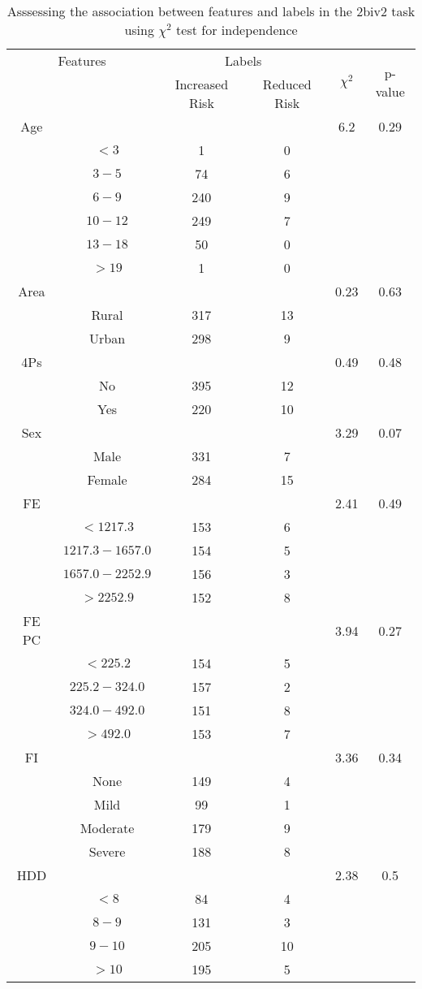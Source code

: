 \begin{table}[!htb]
\centering
\caption{Asssessing the association between features and labels in the 2biv2 task using $\chi^2$ test for independence}
\label{tab:chitest_2biv2}
\begin{tabular}{c c | c c| c | c}
\hline
\multicolumn{2}{c|}{Features}& \multicolumn{2}{c|}{Labels}& \multirow{2}{*}{$\chi^2$} & \multirow{2}{*}{p-value}\\ 
& & Increased Risk & Reduced Risk & & \\ 
\hline
Age &  &  & & 6.2 & 0.29 \\ 
& $< 3$ & 1 & 0& & \\ 
& $3-5$ & 74 & 6& & \\ 
& $6-9$ & 240 & 9& & \\ 
& $10-12$ & 249 & 7& & \\ 
& $13-18$ & 50 & 0& & \\ 
& $> 19$ & 1 & 0& & \\ 
\hline 
Area &  &  & & 0.23 & 0.63 \\ 
& Rural & 317 & 13& & \\ 
& Urban & 298 & 9& & \\ 
\hline 
4Ps &  &  & & 0.49 & 0.48 \\ 
& No & 395 & 12& & \\ 
& Yes & 220 & 10& & \\ 
\hline 
Sex &  &  & & 3.29 & 0.07 \\ 
& Male & 331 & 7& & \\ 
& Female & 284 & 15& & \\ 
\hline 
FE &  &  & & 2.41 & 0.49 \\ 
& $< 1217.3$ & 153 & 6& & \\ 
& $1217.3-1657.0$ & 154 & 5& & \\ 
& $1657.0-2252.9$ & 156 & 3& & \\ 
& $> 2252.9$ & 152 & 8& & \\ 
\hline 
FE PC &  &  & & 3.94 & 0.27 \\ 
& $< 225.2$ & 154 & 5& & \\ 
& $225.2-324.0$ & 157 & 2& & \\ 
& $324.0-492.0$ & 151 & 8& & \\ 
& $> 492.0$ & 153 & 7& & \\ 
\hline 
FI &  &  & & 3.36 & 0.34 \\ 
& None & 149 & 4& & \\ 
& Mild & 99 & 1& & \\ 
& Moderate & 179 & 9& & \\ 
& Severe & 188 & 8& & \\ 
\hline 
HDD &  &  & & 2.38 & 0.5 \\ 
& $< 8$ & 84 & 4& & \\ 
& $8-9$ & 131 & 3& & \\ 
& $9-10$ & 205 & 10& & \\ 
& $> 10$ & 195 & 5& & \\ 
\hline 
\end{tabular}
\end{table}
